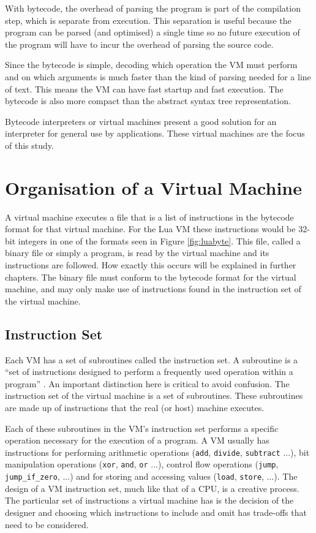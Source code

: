 \documentclass[english,a4paper,12pt]{report}
\begin{document}
With bytecode, the overhead of parsing the program is part of the
compilation step, which is separate from execution. This separation is
useful because the program can be parsed (and optimised) a single time
so no future execution of the program will have to incur the overhead
of parsing the source code.

Since the bytecode is simple, decoding which operation the VM must
perform and on which arguments is much faster than the kind of parsing
needed for a line of text. This means the VM can have fast startup and
fast execution. The bytecode is also more compact than the abstract
syntax tree representation.

Bytecode interpreters or virtual machines present a good solution for
an interpreter for general use by applications. These virtual machines
are the focus of this study.

\section{Organisation of a Virtual Machine} 
A virtual machine executes a file that is a list of instructions in
the bytecode format for that virtual machine. For the Lua VM these
instructions would be 32-bit integers in one of the formats seen in
Figure \ref{fig:luabyte}. This file, called a binary file or simply a
program, is read by the virtual machine and its instructions are
followed. How exactly this occurs will be explained in further
chapters. The binary file must conform to the bytecode format for the
virtual machine, and may only make use of instructions found in the
instruction set of the virtual machine.

\subsection{Instruction Set}
Each VM has a set of subroutines called the instruction set. A
subroutine is a ``set of instructions designed to perform a frequently
used operation within a program'' \cite{ComputerWords}. An important
distinction here is critical to avoid confusion. The instruction set
of the virtual machine is a set of subroutines. These subroutines are
made up of instructions that the real (or host) machine executes.

Each of these subroutines in the VM's instruction set performs a
specific operation necessary for the execution of a program. A VM
usually has instructions for performing arithmetic operations
(\verb|add|, \verb|divide|, \verb|subtract| ...), bit manipulation
operations (\verb|xor|, \verb|and|, \verb|or| ...), control flow
operations (\verb|jump|, \verb|jump_if_zero|, ...) and for storing and
accessing values (\verb|load|, \verb|store|, ...). The design of a VM
instruction set, much like that of a CPU, is a creative process. The
particular set of instructions a virtual machine has is the decision
of the designer and choosing which instructions to include and omit
has trade-offs that need to be considered.
\end{document}
